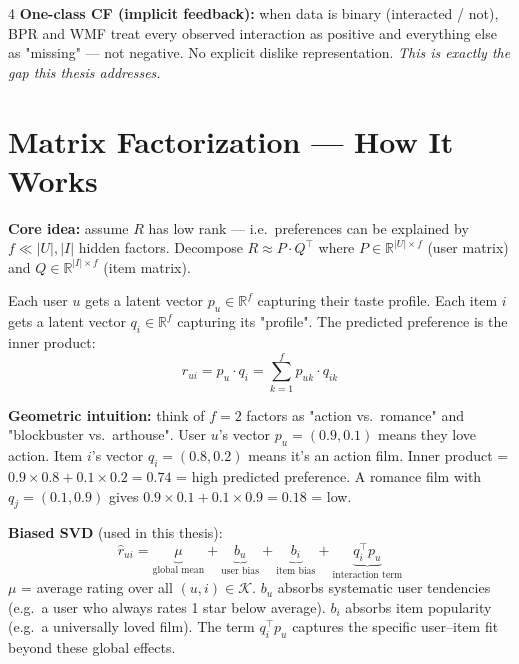 \documentclass[9pt,a4paper,landscape]{article}
\begin{document}
\begin{multicols}{4}
\textbf{One-class CF (implicit feedback):} when data is binary (interacted / not), BPR and WMF treat every observed interaction as positive and everything else as "missing" — not negative. No explicit dislike representation. \emph{This is exactly the gap this thesis addresses.}

\section{Matrix Factorization — How It Works}

\textbf{Core idea:} assume $R$ has low rank — i.e.\ preferences can be explained by $f \ll |U|,|I|$ hidden factors. Decompose $R \approx P \cdot Q^\top$ where $P \in \mathbb{R}^{|U|\times f}$ (user matrix) and $Q \in \mathbb{R}^{|I|\times f}$ (item matrix).

Each user $u$ gets a latent vector $p_u \in \mathbb{R}^f$ capturing their taste profile. Each item $i$ gets a latent vector $q_i \in \mathbb{R}^f$ capturing its "profile". The predicted preference is the inner product:
\[
\hat{r}_{ui} = p_u \cdot q_i = \sum_{k=1}^{f} p_{uk} \cdot q_{ik}
\]

\textbf{Geometric intuition:} think of $f=2$ factors as "action vs.\ romance" and "blockbuster vs.\ arthouse". User $u$'s vector $p_u=(0.9, 0.1)$ means they love action. Item $i$'s vector $q_i=(0.8,0.2)$ means it's an action film. Inner product = $0.9{\times}0.8+0.1{\times}0.2=0.74$ = high predicted preference. A romance film with $q_j=(0.1,0.9)$ gives $0.9{\times}0.1+0.1{\times}0.9=0.18$ = low.

\textbf{Biased SVD} (used in this thesis):
\[
\hat{r}_{ui} = \underbrace{\mu}_{\text{global mean}} + \underbrace{b_u}_{\text{user bias}} + \underbrace{b_i}_{\text{item bias}} + \underbrace{q_i^\top p_u}_{\text{interaction term}}
\]
$\mu$ = average rating over all $(u,i)\in\mathcal{K}$. $b_u$ absorbs systematic user tendencies (e.g.\ a user who always rates 1 star below average). $b_i$ absorbs item popularity (e.g.\ a universally loved film). The term $q_i^\top p_u$ captures the specific user–item fit beyond these global effects.


\end{multicols}
\end{document}
